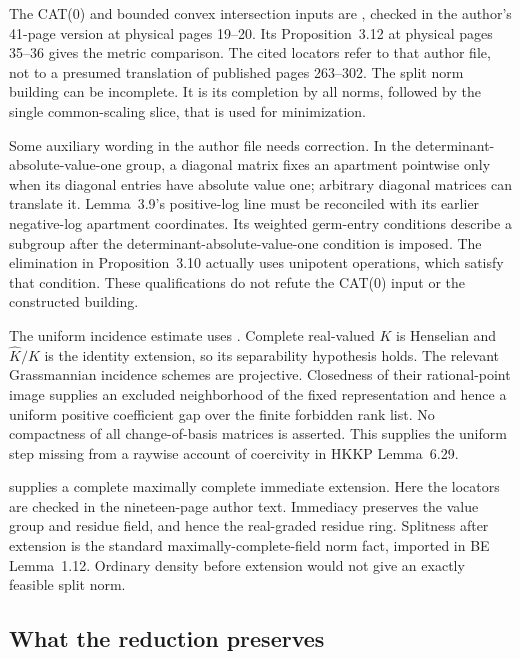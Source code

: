 The CAT(0) and bounded convex intersection inputs are
\cite[Propositions~2.10 and 2.12]{Parreau00AffineAuthor}, checked in
the author's 41-page version at physical pages 19--20.
Its Proposition~3.12 at physical pages 35--36 gives the metric
comparison. The cited locators refer to that author file, not
to a presumed translation of published pages 263--302.
The split norm building can be incomplete. It is its completion
by all norms, followed by the single common-scaling slice, that
is used for minimization.

Some auxiliary wording in the author file needs correction.
In the determinant-absolute-value-one group, a diagonal matrix fixes
an apartment pointwise only when its diagonal entries have absolute
value one; arbitrary diagonal
matrices can translate it. Lemma~3.9's positive-log line must
be reconciled with its earlier negative-log apartment coordinates.
Its weighted germ-entry conditions describe a subgroup after
the determinant-absolute-value-one condition is imposed.
The elimination in Proposition~3.10 actually uses unipotent
operations, which satisfy that condition. These qualifications
do not refute the CAT(0) input or the constructed building.

The uniform incidence estimate uses
\cite[Theorem~1.3 and \S4.3.1]{MoretBailly12ClosedImageV3}.
Complete real-valued $K$ is Henselian and $\widehat K/K$ is the
identity extension, so its separability hypothesis holds.
The relevant Grassmannian incidence schemes are projective.
Closedness of their rational-point image supplies an excluded
neighborhood of the fixed representation and hence a uniform
positive coefficient gap over the finite forbidden rank list.
No compactness of all change-of-basis matrices is asserted.
This supplies the uniform step missing from a raywise account
of coercivity in HKKP Lemma~6.29.

\cite[Corollary~6 and Proposition~6(1)]{Poonen93MaximalAuthor}
supplies a complete maximally complete immediate extension.
Here the locators are checked in the nineteen-page author text.
Immediacy preserves the value group and residue field, and
hence the real-graded residue ring. Splitness after extension
is the standard maximally-complete-field norm fact, imported
in BE Lemma~1.12. Ordinary density before extension would not
give an exactly feasible split norm.

\subsection{What the reduction preserves}

